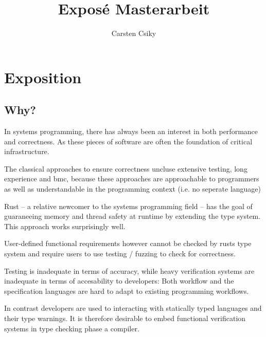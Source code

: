 \documentclass[11pt]{article}
\title{\textbf{Exposé Masterarbeit}}
\author{Carsten Csiky}
\date{}
\begin{document}
\maketitle

\section{Exposition}

\subsection{Why?}

In systems programming, there has always been an interest in both performance and correctness. As 
these pieces of software are often the foundation of critical infrastructure.

The classical approaches to ensure correctness uncluse extensive testing, long experience and bmc, because these approaches are approachable to programmers as well as understandable in the programming context (i.e. no seperate language)

Rust -- a relative newcomer to the systems programming field -- has the goal of guaraneeing memory and thread safety at runtime by extending the type system. This approach works surprisingly well. 

User-defined functional requirements however cannot be checked by rusts type system and require users to use testing / fuzzing to check for correctness.

Testing is inadequate in terms of accuracy, while heavy verification systems are inadequate in terms of accesability to developers:
Both workflow and the specification languages are hard to adapt to existing programming workflows.

In contrast developers are used to interacting with statically typed languages and their type warnings. It is therefore desirable to embed functional verification systems in type checking phase a compiler.



\end{document}
